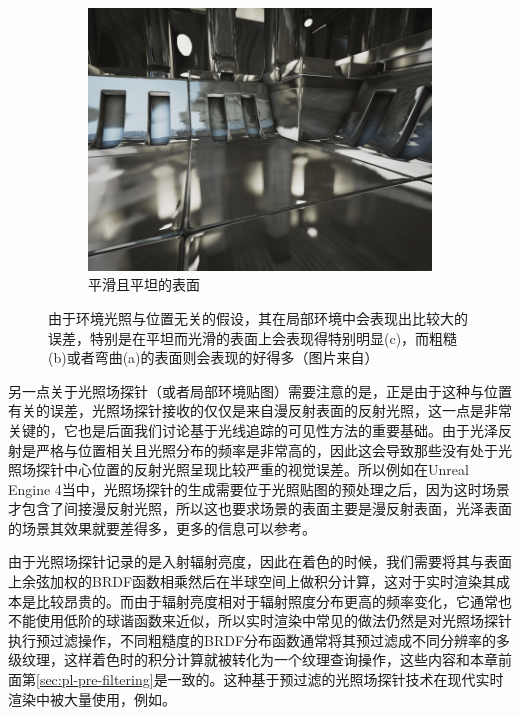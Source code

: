 \begin{figure}
\begin{fullwidth}
\begin{subfigure}[b]{0.33\thewidth}
		\includegraphics[width=\textwidth]{figures/pl/reflection-3}
			\caption{平滑且平坦的表面}
	\end{subfigure}
	\caption{由于环境光照与位置无关的假设，其在局部环境中会表现出比较大的误差，特别是在平坦而光滑的表面上会表现得特别明显(c)，而粗糙(b)或者弯曲(a)的表面则会表现的好得多（图片来自\cite{m:ReflectionEnvironment}）}
	\label{f:pl-reflection-issues}
\end{fullwidth}
\end{figure}

另一点关于光照场探针（或者局部环境贴图）需要注意的是，正是由于这种与位置有关的误差，光照场探针接收的仅仅是来自漫反射表面的反射光照，这一点是非常关键的，它也是后面我们讨论基于光线追踪的可见性方法的重要基础。由于光泽反射是严格与位置相关且光照分布的频率是非常高的，因此这会导致那些没有处于光照场探针中心位置的反射光照呈现比较严重的视觉误差。所以例如在Unreal Engine 4当中，光照场探针的生成需要位于光照贴图的预处理之后，因为这时场景才包含了间接漫反射光照，所以这也要求场景的表面主要是漫反射表面，光泽表面的场景其效果就要差得多，更多的信息可以参考\cite{m:ReflectionEnvironment}。

由于光照场探针记录的是入射辐射亮度，因此在着色的时候，我们需要将其与表面上余弦加权的BRDF函数相乘然后在半球空间上做积分计算，这对于实时渲染其成本是比较昂贵的。而由于辐射亮度相对于辐射照度分布更高的频率变化，它通常也不能使用低阶的球谐函数来近似，所以实时渲染中常见的做法仍然是对光照场探针执行预过滤操作，不同粗糙度的BRDF分布函数通常将其预过滤成不同分辨率的多级纹理，这样着色时的积分计算就被转化为一个纹理查询操作，这些内容和本章前面第\ref{sec:pl-pre-filtering}是一致的。这种基于预过滤的光照场探针技术在现代实时渲染中被大量使用，例如\cite{m:ReflectionEnvironment,m:LightProbes}。

